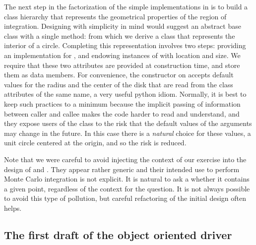 The next step in the factorization of the simple implementations in  is to build
a class hierarchy that represents the geometrical properties of the region of integration.
Designing with simplicity in mind would suggest an abstract base class  with a
single method:
%
%
from which we derive a class  that represents the interior of a circle.  Completing
this representation involves two steps: providing an implementation for , and
endowing instances of  with location and size. We require that these two attributes
are provided at construction time, and store them as data members.
%
%
For convenience, the constructor on  accepts default values for
the radius and the center of the disk that are read from the class attributes of the same name,
a very useful python idiom. Normally, it is best to keep such practices to a minimum because
the implicit passing of information between caller and callee makes the code harder to read and
understand, and they expose users of the class  to the risk that the default values
of the arguments may change in the future. In this case there is a {\em natural} choice for
these values, a unit circle centered at the origin, and so the risk is reduced.

Note that we were careful to avoid injecting the context of our exercise into the design of
 and . They appear rather generic and their intended use to perform
Monte Carlo integration is not explicit. It is natural to ask a  whether it
contains a given point, regardless of the context for the question. It is not always possible
to avoid this type of pollution, but careful refactoring of the initial design often helps. 

\subsection{The first draft of the object oriented driver}
\label{sec:classes:driver:draft}

